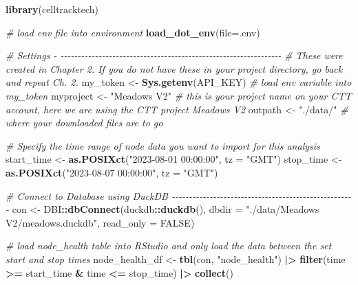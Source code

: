 \documentclass[
]{book}
\newenvironment{Shaded}{\begin{snugshade}}{\end{snugshade}}
\newcommand{\AttributeTok}[1]{\textcolor[rgb]{0.13,0.29,0.53}{#1}}
\newcommand{\CommentTok}[1]{\textcolor[rgb]{0.56,0.35,0.01}{\textit{#1}}}
\newcommand{\ConstantTok}[1]{\textcolor[rgb]{0.56,0.35,0.01}{#1}}
\newcommand{\FunctionTok}[1]{\textcolor[rgb]{0.13,0.29,0.53}{\textbf{#1}}}
\newcommand{\NormalTok}[1]{#1}
\newcommand{\OtherTok}[1]{\textcolor[rgb]{0.56,0.35,0.01}{#1}}
\newcommand{\SpecialCharTok}[1]{\textcolor[rgb]{0.81,0.36,0.00}{\textbf{#1}}}
\newcommand{\StringTok}[1]{\textcolor[rgb]{0.31,0.60,0.02}{#1}}
\begin{document}
\begin{Shaded}
\begin{Highlighting}[]
\FunctionTok{library}\NormalTok{(celltracktech)}

\CommentTok{\# load env file into environment}
\FunctionTok{load\_dot\_env}\NormalTok{(}\AttributeTok{file=}\StringTok{\textquotesingle{}.env\textquotesingle{}}\NormalTok{)}

\CommentTok{\# Settings {-} {-}{-}{-}{-}{-}{-}{-}{-}{-}{-}{-}{-}{-}{-}{-}{-}{-}{-}{-}{-}{-}{-}{-}{-}{-}{-}{-}{-}{-}{-}{-}{-}{-}{-}{-}{-}{-}{-}{-}{-}{-}{-}{-}{-}{-}{-}{-}{-}{-}{-}{-}{-}{-}{-}{-}{-}{-}{-}{-}{-}{-}{-}{-}{-}}
\CommentTok{\# These were created in Chapter 2. If you do not have these in your project directory, go back and repeat Ch. 2.}
\NormalTok{my\_token }\OtherTok{\textless{}{-}} \FunctionTok{Sys.getenv}\NormalTok{(}\StringTok{\textquotesingle{}API\_KEY\textquotesingle{}}\NormalTok{) }\CommentTok{\# load env variable into my\_token}
\NormalTok{myproject }\OtherTok{\textless{}{-}} \StringTok{"Meadows V2"} \CommentTok{\# this is your project name on your CTT account, here we are using the CTT project \textquotesingle{}Meadows V2\textquotesingle{}}
\NormalTok{outpath }\OtherTok{\textless{}{-}} \StringTok{"./data/"} \CommentTok{\# where your downloaded files are to go}

\CommentTok{\# Specify the time range of node data you want to import for this analysis}
\NormalTok{start\_time }\OtherTok{\textless{}{-}} \FunctionTok{as.POSIXct}\NormalTok{(}\StringTok{"2023{-}08{-}01 00:00:00"}\NormalTok{, }\AttributeTok{tz =} \StringTok{"GMT"}\NormalTok{)}
\NormalTok{stop\_time }\OtherTok{\textless{}{-}} \FunctionTok{as.POSIXct}\NormalTok{(}\StringTok{"2023{-}08{-}07 00:00:00"}\NormalTok{, }\AttributeTok{tz =} \StringTok{"GMT"}\NormalTok{)}

\CommentTok{\# Connect to Database using DuckDB {-}{-}{-}{-}{-}{-}{-}{-}{-}{-}{-}{-}{-}{-}{-}{-}{-}{-}{-}{-}{-}{-}{-}{-}{-}{-}{-}{-}{-}{-}{-}{-}{-}{-}{-}{-}{-}{-}{-}{-}{-}{-}{-}{-}{-}{-}{-}{-}{-}{-}{-}{-}{-}}
\NormalTok{con }\OtherTok{\textless{}{-}}\NormalTok{ DBI}\SpecialCharTok{::}\FunctionTok{dbConnect}\NormalTok{(duckdb}\SpecialCharTok{::}\FunctionTok{duckdb}\NormalTok{(), }
                      \AttributeTok{dbdir =} \StringTok{"./data/Meadows V2/meadows.duckdb"}\NormalTok{, }
                      \AttributeTok{read\_only =} \ConstantTok{FALSE}\NormalTok{)}

\CommentTok{\# load node\_health table into RStudio and only load the data between the set start and stop times}
\NormalTok{node\_health\_df }\OtherTok{\textless{}{-}} \FunctionTok{tbl}\NormalTok{(con, }\StringTok{"node\_health"}\NormalTok{) }\SpecialCharTok{|\textgreater{}} 
  \FunctionTok{filter}\NormalTok{(time }\SpecialCharTok{\textgreater{}=}\NormalTok{ start\_time }\SpecialCharTok{\&}\NormalTok{ time }\SpecialCharTok{\textless{}=}\NormalTok{ stop\_time) }\SpecialCharTok{|\textgreater{}}
  \FunctionTok{collect}\NormalTok{()}


\end{Highlighting}
\end{Shaded}
\end{document}
